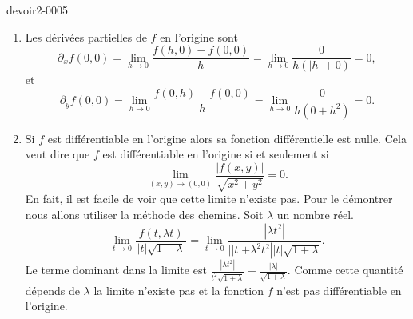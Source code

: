 \begin{corrige}{devoir2-0005}
  
  \begin{enumerate}
  \item Les dérivées partielles de $f$ en l'origine sont 
    \begin{equation}
      \partial_x f(0,0)=\lim_{h\to 0}\frac{f(h,0)-f(0,0)}{h}= \lim_{h\to 0} \frac{0}{h (|h|+0)} = 0, 
    \end{equation} et 
    \begin{equation}
      \partial_y f(0,0)=\lim_{h\to 0}\frac{f(0,h)-f(0,0)}{h}= \lim_{h\to 0} \frac{0}{h (0+ h^2)} = 0. 
    \end{equation}
  \item Si $f$ est différentiable en l'origine alors sa fonction différentielle est nulle. Cela veut dire que  $f$ est différentiable en l'origine si et seulement si 
    \[
    \lim_{(x,y)\to (0,0)} \frac{|f(x,y)|}{\sqrt{x^2+y^2}}=0. 
    \] 
    En fait, il est facile de voir que cette limite n'existe pas. Pour le démontrer nous allons utiliser la méthode des chemins. Soit $\lambda$ un nombre réel.  
    \begin{equation}
      \lim_{t\to 0} \frac{|f(t,\lambda t)|}{|t|\sqrt{1+\lambda}}=\lim_{t\to 0} \frac{|\lambda t^2|}{||t|+\lambda^2 t^2||t|\sqrt{1+\lambda}}. 
    \end{equation}
    Le terme dominant dans la limite est $\displaystyle \frac{|\lambda t^2|}{t^2\sqrt{1+\lambda}}= \frac{|\lambda|}{\sqrt{1+\lambda}}$. Comme cette quantité dépends de $\lambda$ la limite n'existe pas et la fonction $f$ n'est pas différentiable en l'origine. 
 \end{enumerate}
\end{corrige}
